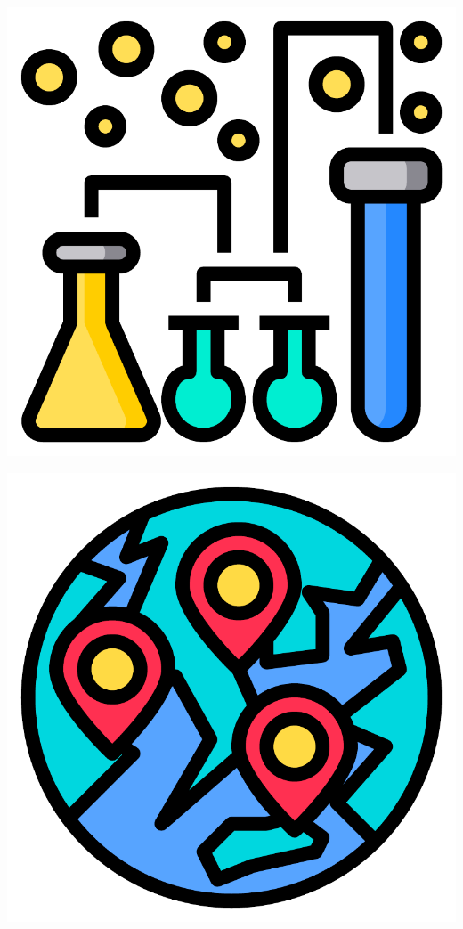 \documentclass[xcolor=svgnames,10pt,aspectratio=1610]{beamer}
\begin{document}
\begin{frame}
  \begin{minipage}{.7\textwidth}
    \hspace{-0.3cm}
    \begin{minipage}{0.05\textwidth}
      \includegraphics[width=\textwidth]{img/testing.pdf}
    \end{minipage}
    \begin{minipage}{0.05\textwidth}
      \includegraphics[width=\textwidth]{img/globe.pdf}

\end{minipage}
\end{minipage}
\end{frame}
\end{document}
